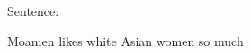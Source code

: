 \documentclass{article}
\begin{document}
Sentence: \parbox{3cm}{Moamen likes white Asian women so much}
\end{document}
